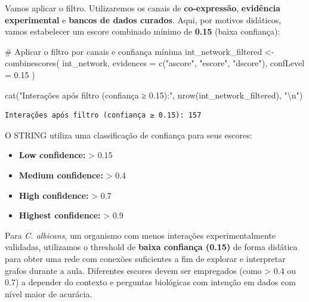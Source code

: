\documentclass[
  letterpaper,
  DIV=11,
  numbers=noendperiod]{scrreprt}
\newenvironment{Shaded}{\begin{snugshade}}{\end{snugshade}}
\newcommand{\AttributeTok}[1]{\textcolor[rgb]{0.40,0.45,0.13}{#1}}
\newcommand{\CommentTok}[1]{\textcolor[rgb]{0.37,0.37,0.37}{#1}}
\newcommand{\FloatTok}[1]{\textcolor[rgb]{0.68,0.00,0.00}{#1}}
\newcommand{\FunctionTok}[1]{\textcolor[rgb]{0.28,0.35,0.67}{#1}}
\newcommand{\NormalTok}[1]{\textcolor[rgb]{0.00,0.23,0.31}{#1}}
\newcommand{\OtherTok}[1]{\textcolor[rgb]{0.00,0.23,0.31}{#1}}
\newcommand{\SpecialCharTok}[1]{\textcolor[rgb]{0.37,0.37,0.37}{#1}}
\newcommand{\StringTok}[1]{\textcolor[rgb]{0.13,0.47,0.30}{#1}}
\providecommand{\tightlist}{%
  \setlength{\itemsep}{0pt}\setlength{\parskip}{0pt}}
\begin{document}
Vamos aplicar o filtro. Utilizaremos os canais de \textbf{co-expressão},
\textbf{evidência experimental} e \textbf{bancos de dados curados}.
Aqui, por motivos didáticos, vamos estabelecer um escore combinado
mínimo de \textbf{0.15} (baixa confiança):

\begin{Shaded}
\begin{Highlighting}[]
\CommentTok{\# Aplicar o filtro por canais e confiança mínima}
\NormalTok{int\_network\_filtered }\OtherTok{\textless{}{-}} \FunctionTok{combinescores}\NormalTok{(}
\NormalTok{  int\_network,}
  \AttributeTok{evidences =} \FunctionTok{c}\NormalTok{(}\StringTok{"ascore"}\NormalTok{, }\StringTok{"escore"}\NormalTok{, }\StringTok{"dscore"}\NormalTok{),}
  \AttributeTok{confLevel =} \FloatTok{0.15}
\NormalTok{)}

\FunctionTok{cat}\NormalTok{(}\StringTok{"Interações após filtro (confiança ≥ 0.15):"}\NormalTok{, }\FunctionTok{nrow}\NormalTok{(int\_network\_filtered), }\StringTok{"}\SpecialCharTok{\textbackslash{}n}\StringTok{"}\NormalTok{)}
\end{Highlighting}
\end{Shaded}

\begin{verbatim}
Interações após filtro (confiança ≥ 0.15): 157 
\end{verbatim}

\begin{tcolorbox}[enhanced jigsaw, arc=.35mm, colframe=quarto-callout-note-color-frame, breakable, bottomrule=.15mm, colback=white, left=2mm, titlerule=0mm, opacityback=0, title=\textcolor{quarto-callout-note-color}{\faInfo}\hspace{0.5em}{Ponto Importante --- Escolha do Threshold}, leftrule=.75mm, colbacktitle=quarto-callout-note-color!10!white, bottomtitle=1mm, toprule=.15mm, toptitle=1mm, rightrule=.15mm, opacitybacktitle=0.6, coltitle=black]

O STRING utiliza uma classificação de confiança para seus escores:

\begin{itemize}
\tightlist
\item
  \textbf{Low confidence:} \textgreater{} 0.15
\item
  \textbf{Medium confidence:} \textgreater{} 0.4
\item
  \textbf{High confidence:} \textgreater{} 0.7
\item
  \textbf{Highest confidence:} \textgreater{} 0.9
\end{itemize}

Para \emph{C. albicans}, um organismo com menos interações
experimentalmente validadas, utilizamos o threshold de \textbf{baixa
confiança (0.15)} de forma didática para obter uma rede com conexões
suficientes a fim de explorar e interpretar grafos durante a aula.
Diferentes escores devem ser empregados (como \textgreater{} 0.4 ou 0.7)
a depender do contexto e perguntas biológicas com intenção em dados com
nível maior de acurácia.

\end{tcolorbox}
\end{document}
